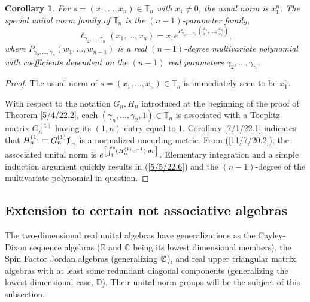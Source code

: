 \documentclass{amsart}
\numberwithin{equation}{section}
\newtheorem{corollary}[theorem]{Corollary}
\theoremstyle{definition}
\numberwithin{theorem}{section}
\begin{document}
\begin{corollary}\label{5/17/22.1} For $s= (x_1,\dots,x_n)\in \mathbb{T}_n$ with $x_1\ne 0$, the usual norm is $x_1^n$.  The special unital norm family of $\mathbb{T}_n$ is the $(n-1)$-parameter family,
\begin{equation} \label{5/5/22.6} \ell_{\gamma_2,\dots,\gamma_n}(x_1,\dots,x_n) = x_1 e^{P_{\gamma_2,\dots,\gamma_n}\left(\frac{x_2}{x_1},\dots,\frac{x_n}{x_1}\right)},\end{equation} \enlargethispage{1cm} where $P_{\gamma_2,\dots,\gamma_n}(w_1,\dots,w_{n-1})$ is a real $(n-1)$-degree multivariate polynomial with coefficients dependent on the $(n-1)$ real parameters $\gamma_2,\dots,\gamma_n$.    \end{corollary}

\begin{proof} The usual norm of $s=(x_1,\dots,x_n)\in \mathbb{T}_n$ is immediately seen to be $x_1^n$.

With respect to the notation $G_n,H_n$ introduced at the beginning of the proof of Theorem \ref{5/4/22.2}, each $(\gamma_n,\dots,\gamma_2,1)\in\mathbb{T}_n$ is associated with a Toeplitz matrix $G_n^{(1)}$ having its $(1,n)$-entry equal to $1$.  Corollary \ref{7/1/22.1} indicates that $H^{(1)}_n\equiv G_n^{(1)}\slashed{\bf 1}_n$ is a normalized uncurling metric. From (\ref{11/7/20.2}),  the associated unital norm is $e^{\left[\int_{\bf 1}^s (H_n^{(1)} v^{-1})\cdot dv\right]}$.  Elementary integration and a simple induction argument quickly results in (\ref{5/5/22.6}) and the $(n-1)$-degree of the multivariate polynomial in question.
\end{proof}
 
\subsection{Extension to certain not associative algebras}
The two-dimensional real unital algebras have generalizations as the Cayley-Dixon sequence algebras ($\mathbb{R}$ and $\mathbb{C}$ being its lowest dimensional members),  the Spin Factor Jordan algebras (generalizing $\slashed{\mathbb{C}}$), and real upper triangular matrix algebras with at least some redundant diagonal components (generalizing the lowest dimensional case, $\mathbb{D}$).  Their unital norm groups will be the subject of this subsection. 
\end{document}
